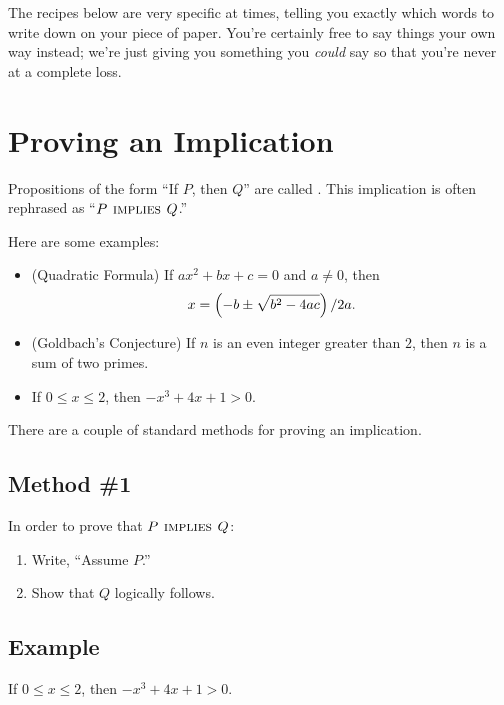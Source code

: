 The recipes below are very specific at times, telling you exactly
which words to write down on your piece of paper.  You're certainly
free to say things your own way instead; we're just giving you
something you \textit{could} say so that you're never at a complete
loss.


\section{Proving an Implication}
\label{sec:prove_implies}

Propositions of the form ``If $P$, then $Q$'' are called
.  This implication is often rephrased as ``$P
\mathbin{\mathrm{\textsc{\,implies\,}}} Q$.''

Here are some examples:
%
\begin{itemize}

\item (Quadratic Formula) If $a x^2 + b x + c = 0$ and $a \neq 0$,
then
\[
x = \left(- b \pm \sqrt{b^2 - 4 a c}\right) / 2a.
\]

\item (Goldbach's Conjecture) If $n$ is an even integer greater than
$2$, then $n$ is a sum of two primes.

\item If $0 \leq x \leq 2$, then $-x^3 + 4x + 1 > 0$.

\end{itemize}
%
There are a couple of standard methods for proving an implication.

\subsection{Method \#1}

In order to prove that $P \mathbin{\mathrm{\textsc{\,implies\,}}} Q$:
%
\begin{enumerate}
\item Write, ``Assume $P$.''
\item Show that $Q$ logically follows.
\end{enumerate}

\subsection*{Example}

\begin{theorem}
If $0 \leq x \leq 2$, then $-x^3 + 4x + 1 > 0$.
\end{theorem}


